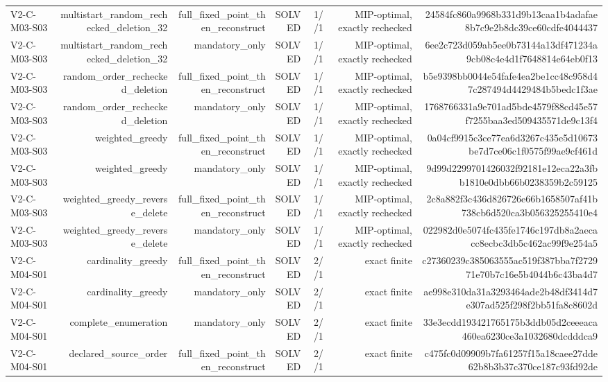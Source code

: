 {\begin{longtable}{lrrrrrr}
V2-C-M03-S03 & multistart\_random\_rechecked\_deletion\_32 & full\_fixed\_point\_then\_reconstruct & SOLVED & 1//1 & MIP-optimal, exactly rechecked & 24584fc860a9968b331d9b13caa1b4adafae8b7c9e2b8dc39ce60cdfe4044437 \\
V2-C-M03-S03 & multistart\_random\_rechecked\_deletion\_32 & mandatory\_only & SOLVED & 1//1 & MIP-optimal, exactly rechecked & 6ee2c723d059ab5ee0b73144a13df471234a9cb08c4e4d1f7648814e64eb0f13 \\
V2-C-M03-S03 & random\_order\_rechecked\_deletion & full\_fixed\_point\_then\_reconstruct & SOLVED & 1//1 & MIP-optimal, exactly rechecked & b5e9398bb0044e54fafe4ea2be1cc48c958d47c287494d4429484b5bedc1f3ae \\
V2-C-M03-S03 & random\_order\_rechecked\_deletion & mandatory\_only & SOLVED & 1//1 & MIP-optimal, exactly rechecked & 1768766331a9e701ad5bde4579f88cd45e57f7255baa3ed509435571de9c13f4 \\
V2-C-M03-S03 & weighted\_greedy & full\_fixed\_point\_then\_reconstruct & SOLVED & 1//1 & MIP-optimal, exactly rechecked & 0a04cf9915c3ce77ea6d3267c435e5d10673be7d7ce06c1f0575f99ae9cf461d \\
V2-C-M03-S03 & weighted\_greedy & mandatory\_only & SOLVED & 1//1 & MIP-optimal, exactly rechecked & 9d99d2299701426032f92181e12eca22a3fbb1810e0dbb66b0238359b2c59125 \\
V2-C-M03-S03 & weighted\_greedy\_reverse\_delete & full\_fixed\_point\_then\_reconstruct & SOLVED & 1//1 & MIP-optimal, exactly rechecked & 2c8a882f3c436d826726e66b1658507af41b738cb6d520ca3b056325255410e4 \\
V2-C-M03-S03 & weighted\_greedy\_reverse\_delete & mandatory\_only & SOLVED & 1//1 & MIP-optimal, exactly rechecked & 022982d0e5074fc435fe1746c197db8a2aecacc8ecbc3db5c462ac99f9e254a5 \\
V2-C-M04-S01 & cardinality\_greedy & full\_fixed\_point\_then\_reconstruct & SOLVED & 2//1 & exact finite & c27360239c385063555ac519f387bba7f272971e70b7c16e5b4044b6c43ba4d7 \\
V2-C-M04-S01 & cardinality\_greedy & mandatory\_only & SOLVED & 2//1 & exact finite & ae998e310da31a3293464ade2b48df3414d7e307ad525f298f2bb51fa8c8602d \\
V2-C-M04-S01 & complete\_enumeration & mandatory\_only & SOLVED & 2//1 & exact finite & 33e3ecdd193421765175b3ddb05d2ceeeaca460ea6230ce3a1032680dcdddca9 \\
V2-C-M04-S01 & declared\_source\_order & full\_fixed\_point\_then\_reconstruct & SOLVED & 2//1 & exact finite & c475fc0d09909b7fa61257f15a18caee27dde62b8b3b37c370ce187c93fd92de \\

\end{longtable}}
